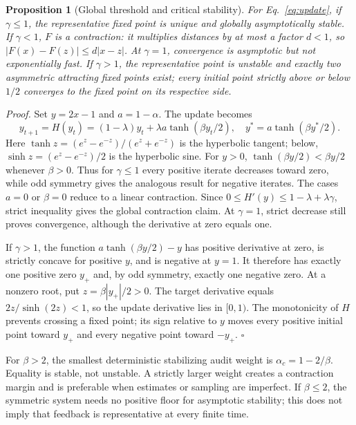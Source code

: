 \documentclass{article}
\newtheorem{proposition}{Proposition}
\begin{document}
\begin{proposition}[Global threshold and critical stability]\label{prop:threshold}
For Eq.~\eqref{eq:update}, if $\gamma\le1$, the representative fixed point is unique and globally asymptotically stable. If $\gamma<1$, $F$ is a contraction: it multiplies distances by at most a factor $d<1$, so $|F(x)-F(z)|\le d|x-z|$. At $\gamma=1$, convergence is asymptotic but not exponentially fast. If $\gamma>1$, the representative point is unstable and exactly two asymmetric attracting fixed points exist; every initial point strictly above or below $1/2$ converges to the fixed point on its respective side.
\end{proposition}
\emph{Proof.} Set $y=2x-1$ and $a=1-\alpha$. The update becomes
\begin{equation}
y_{t+1}=H(y_t)=(1-\lambda)y_t+\lambda a\tanh(\beta y_t/2),
\quad y^*=a\tanh(\beta y^*/2).
\label{eq:fixed}
\end{equation}
Here $\tanh z=(e^z-e^{-z})/(e^z+e^{-z})$ is the hyperbolic tangent; below, $\sinh z=(e^z-e^{-z})/2$ is the hyperbolic sine. For $y>0$, $\tanh(\beta y/2)<\beta y/2$ whenever $\beta>0$. Thus for $\gamma\le1$ every positive iterate decreases toward zero, while odd symmetry gives the analogous result for negative iterates. The cases $a=0$ or $\beta=0$ reduce to a linear contraction. Since $0\le H'(y)\le1-\lambda+\lambda\gamma$, strict inequality gives the global contraction claim. At $\gamma=1$, strict decrease still proves convergence, although the derivative at zero equals one.

If $\gamma>1$, the function $a\tanh(\beta y/2)-y$ has positive derivative at zero, is strictly concave for positive $y$, and is negative at $y=1$. It therefore has exactly one positive zero $y_+$ and, by odd symmetry, exactly one negative zero. At a nonzero root, put $z=\beta|y_+|/2>0$. The target derivative equals $2z/\sinh(2z)<1$, so the update derivative lies in $[0,1)$. The monotonicity of $H$ prevents crossing a fixed point; its sign relative to $y$ moves every positive initial point toward $y_+$ and every negative point toward $-y_+$. $\square$

For $\beta>2$, the smallest deterministic stabilizing audit weight is $\alpha_c=1-2/\beta$. Equality is stable, not unstable. A strictly larger weight creates a contraction margin and is preferable when estimates or sampling are imperfect. If $\beta\le2$, the symmetric system needs no positive floor for asymptotic stability; this does not imply that feedback is representative at every finite time.
\end{document}
